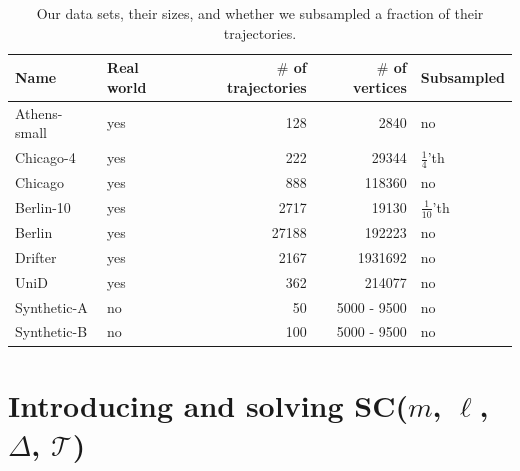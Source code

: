 \documentclass[english, thm-restate]{lipics-v2021}
\begin{document}
\vspace{1cm}




\begin{table}[h]
    \centering {}
    \begin{tabular}{@{}llrrl@{}}
    \toprule
      \textbf{Name} & \textbf{Real world} & \textbf{$\#$ of trajectories} & \textbf{$\#$ of vertices} & \textbf{Subsampled}  \\
      \midrule
        Athens-small & yes & 128           & 2840 & no \\
        Chicago-4 & yes & 222         & 29344 & $\frac{1}{4}$'th  \\
        Chicago & yes & 888         & 118360 & no \\
        Berlin-10 & yes & 2717         & 19130 & $\frac{1}{10}$'th  \\
        Berlin & yes & 27188        & 192223 & no \\
        Drifter & yes & 2167       & 1931692 & no \\
        UniD & yes & 362        & 214077 & no \\
        Synthetic-A & no & 50 & 5000 - 9500 & no\\
        Synthetic-B & no & 100 &  5000 - 9500 & no \\
        \bottomrule
    \end{tabular}
    \caption{Our data sets, their sizes, and whether we subsampled a fraction of their trajectories.}
        \label{tab:data_sets}
    \label{tab:my_label}
\end{table}

\clearpage 

\section{\texorpdfstring{Introducing and solving SC($m$, $\ell$, $\Delta$, $\mathcal{T}$)}{Introducing and solving SC(m, l, D, T)} }
\label{main:BBGLL}
\end{document}
